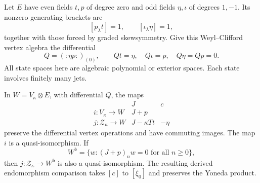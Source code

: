 Let $E$ have even fields $t,p$ of degree zero and odd fields
$\eta,\iota$ of degrees $1,-1$. Its nonzero generating brackets
are
\[
 [p_\lambda t]=1,\qquad [\iota_\lambda\eta]=1,
\]
together with those forced by graded skewsymmetry.
Give this Weyl--Clifford vertex algebra the differential
\[
 Q=(:\eta p:)_{(0)},\qquad
 Qt=\eta,\quad Q\iota=p,\quad Q\eta=Qp=0.
\]
All state spaces here are algebraic polynomial or exterior spaces.
Each state involves finitely many jets.

\begin{theorem}
\label{v4-arith:centers:thm:quartet}
In $W=V_\kappa\otimes E$, with differential $Q$, the maps
\[
 \begin{array}{c|cc}
 &J&c\\ \hline
 i:V_\kappa\longrightarrow W&J+p&\\
 j:\mathcal Z_\kappa\longrightarrow W&J-\kappa Tt&-\eta
 \end{array}
\]
preserve the differential vertex operations and have commuting
images. The map $i$ is a quasi-isomorphism. If
\[
 W^{\mathfrak b}
 =\{w:(J+p)_nw=0\text{ for all }n\geq0\},
\]
then $j:\mathcal Z_\kappa\to W^{\mathfrak b}$ is also a
quasi-isomorphism. The resulting derived endomorphism comparison
takes $[c]$ to $[\xi_0]$ and preserves the Yoneda product.
\end{theorem}

